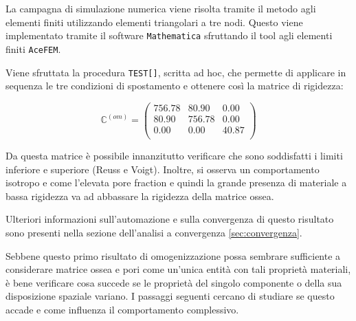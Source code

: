 \documentclass[a4paper,num-refs]{oup-contemporary}
\begin{document}
La campagna di simulazione numerica viene risolta tramite il metodo agli elementi finiti utilizzando elementi triangolari a tre nodi. Questo viene implementato tramite il software \texttt{Mathematica} sfruttando il tool agli elementi finiti \texttt{AceFEM}. 

Viene sfruttata la procedura \texttt{TEST[]}, scritta ad hoc, che permette di applicare in sequenza le tre condizioni di spostamento e ottenere così la matrice di rigidezza:

\begin{equation}
\mathbb C^{(om)}=\left(
\begin{array}{ccc}
	756.78 & 80.90 & 0.00 \\
	80.90 & 756.78 & 0.00 \\
	0.00 & 0.00 & 40.87\\
\end{array}
\right)
\end{equation}

Da questa matrice è possibile innanzitutto verificare che sono soddisfatti i limiti inferiore e superiore (Reuss e Voigt). 
Inoltre, si osserva un comportamento isotropo e come l'elevata pore fraction e quindi la grande presenza di materiale a bassa rigidezza va ad abbassare la rigidezza della matrice ossea. 

Ulteriori informazioni sull'automazione e sulla convergenza di questo risultato sono presenti nella sezione dell'analisi a convergenza \cref{sec:convergenza}.

Sebbene questo primo risultato di omogenizzazione possa sembrare sufficiente a considerare matrice ossea e pori come un'unica entità con tali proprietà materiali, è bene verificare cosa succede se le proprietà del singolo componente o della sua disposizione spaziale variano. I passaggi seguenti cercano di studiare se questo accade e come influenza il comportamento complessivo. 
\end{document}
